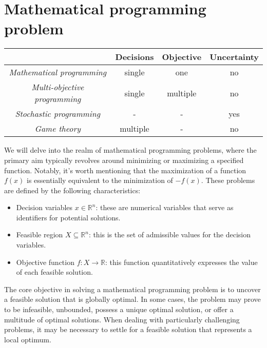 \section{Mathematical programming problem}

\begin{table}[H]
    \centering
    \begin{tabular}{c|ccc|}
    \cline{2-4}
                                                               & \textbf{Decisions} & \textbf{Objective} & \textbf{Uncertainty} \\ \hline
    \multicolumn{1}{|c|}{\textit{Mathematical programming}}    & single                   & one                          & no                   \\
    \multicolumn{1}{|c|}{\textit{Multi-objective programming}} & single                   & multiple                     & no                   \\
    \multicolumn{1}{|c|}{\textit{Stochastic programming}}      & -                        & -                            & yes                  \\
    \multicolumn{1}{|c|}{\textit{Game theory}}                 & multiple                 & -                            & no                   \\ \hline
    \end{tabular}
\end{table}
We will delve into the realm of mathematical programming problems, where the primary aim typically revolves around minimizing or maximizing a specified function. 
Notably, it's worth mentioning that the maximization of a function $f(x)$ is essentially equivalent to the minimization of $-f(x)$. 
These problems are defined by the following characteristics:
\begin{itemize}
    \item Decision variables $x \in \mathbb{R}^n$: these are numerical variables that serve as identifiers for potential solutions.
    \item Feasible region $X \subseteq \mathbb{R}^n$: this is the set of admissible values for the decision variables.
    \item Objective function $f:X \rightarrow\mathbb{R}$: this function quantitatively expresses the value of each feasible solution.
\end{itemize}
The core objective in solving a mathematical programming problem is to uncover a feasible solution that is globally optimal. 
In some cases, the problem may prove to be infeasible, unbounded, possess a unique optimal solution, or offer a multitude of optimal solutions. 
When dealing with particularly challenging problems, it may be necessary to settle for a feasible solution that represents a local optimum.

